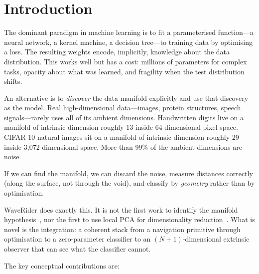 \documentclass[12pt,letterpaper]{article}
\begin{document}
\section{Introduction}

The dominant paradigm in machine learning is to fit a parameterised function---a
neural network, a kernel machine, a decision tree---to training data by
optimising a loss. The resulting weights encode, implicitly, knowledge about the
data distribution. This works well but has a cost: millions of parameters for
complex tasks, opacity about what was learned, and fragility when the test
distribution shifts.

An alternative is to \emph{discover} the data manifold explicitly and use that
discovery as the model. Real high-dimensional data---images, protein structures,
speech signals---rarely uses all of its ambient dimensions. Handwritten digits
live on a manifold of intrinsic dimension roughly 13 inside 64-dimensional pixel
space. CIFAR-10 natural images sit on a manifold of intrinsic dimension roughly
29 inside 3{,}072-dimensional space. More than 99\% of the ambient dimensions
are noise.

If we can find the manifold, we can discard the noise, measure distances
correctly (along the surface, not through the void), and classify by
\emph{geometry} rather than by optimisation.

WaveRider does exactly this. It is not the first work to identify the manifold
hypothesis~\cite{isomap,lle}, nor the first to use local PCA for dimensionality
reduction~\cite{kambhatla97,hinton06}. What is novel is the integration: a
coherent stack from a navigation primitive through optimisation to a
zero-parameter classifier to an $(N+1)$-dimensional extrinsic observer that can
see what the classifier cannot.

The key conceptual contributions are:
\end{document}
